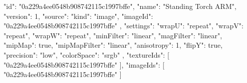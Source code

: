 {
  "id": "0a229a4ee0548b908742115c1997bffe",
  "name": "Standing Torch ARM",
  "version": 1,
  "source": {
    "kind": "image",
    "imageId": "0a229a4ee0548b908742115c1997bffe"
  },
  "settings": {
    "wrapU": "repeat",
    "wrapV": "repeat",
    "wrapW": "repeat",
    "minFilter": "linear",
    "magFilter": "linear",
    "mipMap": true,
    "mipMapFilter": "linear",
    "anisotropy": 1,
    "flipY": true,
    "precision": "low",
    "colorSpace": "srgb"
  },
  "textureIds": [
    "0a229a4ee0548b908742115c1997bffe"
  ],
  "imageIds": [
    "0a229a4ee0548b908742115c1997bffe"
  ]
}
